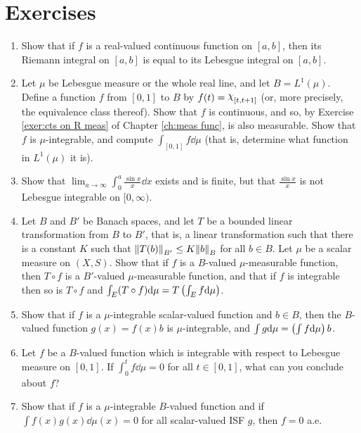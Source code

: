 \section{Exercises}
\begin{enumerate}[label=\arabic*),ref=\arabic*]
\item Show that if $f$ is a real-valued continuous function on $[a,b]$, then its Riemann integral on $[a,b]$ is equal to its Lebesgue integral on $[a,b]$.

\item \label{exer:integral of L1 func}
Let $\mu$ be Lebesgue measure or the whole real line, and let $B=L^1(\mu)$. Define a function $f$ from $[0,1]$ to $B$ by $f(t)=\idf{[t, t+1]}$ (or, more precisely, the equivalence class thereof). Show that $f$ is continuous, and so, by Exercise \ref{exer:cts on R meas} of Chapter \ref{ch:meas func}, is also measurable. Show that $f$ is $\mu$-integrable, and compute $\int_{[0,1]}f\dd\mu$ (that is, determine what function in $L^1(\mu)$ it is).

\item Show that $\lim _{a\to\infty}\int_0^a\frac{\sin x}{x}\dd x$ exists and is finite, but that $\frac{\sin x}{x}$ is not Lebesgue integrable on $[0,\infty)$.

\item \label{exer:integral compose linear functional}
Let $B$ and $B'$ be Banach spaces, and let $T$ be a bounded linear transformation from $B$ to $B'$, that is, a linear transformation such that there is a constant $K$ such that $\norm{T(b)}_{B'}\leq K\norm{b}_B$ for all $b\in B$. Let $\mu$ be a scalar measure on $(X,S)$. Show that if $f$ is a $B$-valued $\mu$-measurable function, then $T\circ f$ is a $B'$-valued $\mu$-measurable function, and that if $f$ is integrable then so is $T\circ f$ and $\int_E(T\circ f)\dd\mu=T\left(\int_Ef\dd\mu\right)$.

\item Show that if $f$ is a $\mu$-integrable scalar-valued function and $b\in B$, then the $B$-valued function $g(x)=f(x)b$ is $\mu$-integrable, and $\int g\dd\mu=\left(\int f\dd\mu\right)b$.

\item Let $f$ be a $B$-valued function which is integrable with respect to Lebesgue measure on $[0,1]$. If $\int_0^t f\dd\mu=0$ for all $t\in[0,1]$, what can you conclude about $f$?

\item Show that if $f$ is a $\mu$-integrable $B$-valued function and if $\int f(x)g(x)\dd\mu(x)=0$ for all scalar-valued ISF $g$, then $f=0$ a.e.


\end{enumerate}

